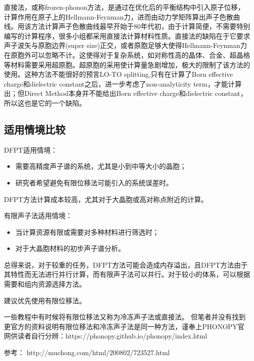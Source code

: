 \begin{extend}
    直接法，或称frozen-phonon方法，是通过在优化后的平衡结构中引入原子位移，计算作用在原子上的Hellmann-Feynman力，进而由动力学矩阵算出声子色散曲线。用该方法计算声子色散曲线最早开始于80年代初，由于计算简便，不需要特别编写的计算程序，很多小组都采用直接法计算材料性质。直接法的缺陷在于它要求声子波矢与原胞边界(super size)正交，或者原胞足够大使得Hellmann-Feynman力在原胞外可以忽略不计。这使得对于复杂系统，如对称性高的晶体、合金、超晶格等材料需要采用超原胞。超原胞的采用使计算量急剧增加，极大的限制了该方法的使用。这种方法不能很好的预言LO-TO splitting,只有在计算了Born effective charge和dielectric constant之后，进一步考虑了non-analyticity term，才能计算出；但Direct Method本身并不能给出Born effective charge和dielectric constant，所以这也是它的一个缺陷。
\end{extend}

\subsection{适用情境比较}\label{subsec:计算方法简介-适用情境比较}

DFPT适用情境：
\begin{itemize}
    \item 需要高精度声子谱的系统，尤其是小到中等大小的晶胞；
    \item 研究者希望避免有限位移法可能引入的系统误差时。
\end{itemize}
\begin{attention}
    DFPT方法计算成本较高，尤其对于大晶胞或高对称点附近的计算。
\end{attention}

有限声子法适用情境：
\begin{itemize}
    \item 当计算资源有限或需要对多种材料进行筛选时；
    \item 对于大晶胞材料的初步声子谱分析。
\end{itemize}

总得来说，对于较重的任务，DFPT方法可能会造成内存溢出，且DFPT方法由于其特性而无法进行并行计算，而有限声子法可以并行。对于较小的体系，可以根据需要和组内资源选择方法。

\begin{extend}
    建议优先使用有限位移法。

    一些教程中有时候将有限位移法又称为冷冻声子法或直接法。
    但笔者并没有找到更官方的资料说明有限位移法和冷冻声子法是同一种方法，谨奉上PHONOPY官网供读者自行分辨：https://phonopy.github.io/phonopy/index.html
\end{extend}

参考：
http://muchong.com/html/200802/723527.html